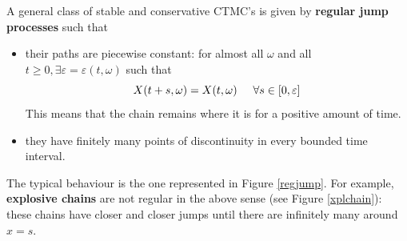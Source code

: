 \documentclass{article}
\begin{document}
	\begin{definition}
		A general class of stable and conservative CTMC's is given by \textbf{regular jump processes} such that 
		\begin{itemize}
			\item their paths are piecewise constant: for almost all $\omega$ and all $t \geqslant 0, \exists \varepsilon = \varepsilon(t,\omega)$ such that 
			\begin{equation*}
				X(t+s,\omega) = X(t,\omega) \hspace{0.5 cm} \forall s \in [0,\varepsilon]
			\end{equation*}
			This means that the chain remains where it is for a positive amount of time. 
			\item they have finitely many points of discontinuity in every bounded time interval.
		\end{itemize}
	\end{definition}
	The typical behaviour is the one represented in Figure \ref{regjump}. %
	For example, \textbf{explosive chains} are not regular in the above sense (see Figure \ref{xplchain}): these chains have closer and closer jumps until there are infinitely many around $x=s$.%
	
\end{document}

